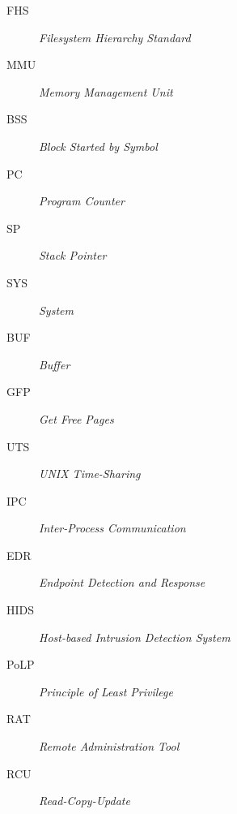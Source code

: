 \begin{description}
    \item[FHS] \emph{Filesystem Hierarchy Standard}
	\item[MMU] \emph{Memory Management Unit}
	\item[BSS] \emph{Block Started by Symbol}
	\item[PC] \emph{Program Counter}
    \item[SP] \emph{Stack Pointer}
	\item[SYS] \emph{System}
	\item[BUF] \emph{Buffer}
	\item[GFP] \emph{Get Free Pages}
    \item[UTS] \emph{UNIX Time-Sharing}
    \item[IPC] \emph{Inter-Process Communication}
    \item[EDR] \emph{Endpoint Detection and Response}
    \item[HIDS] \emph{Host-based Intrusion Detection System}
    \item[PoLP] \emph{Principle of Least Privilege}
    \item[RAT] \emph{Remote Administration Tool}
    \item[RCU] \emph{Read-Copy-Update}
\end{description}
